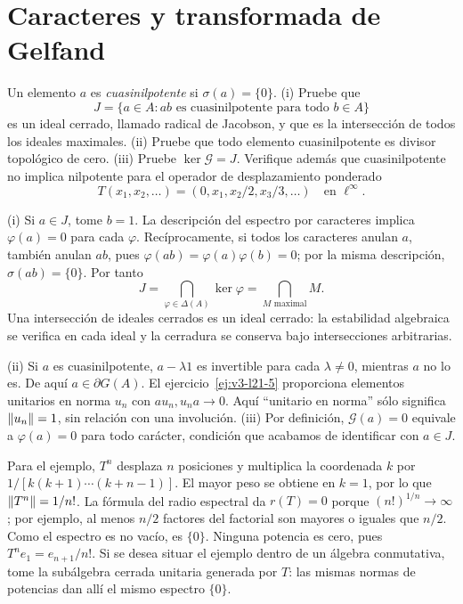 \chapter{Caracteres y transformada de Gelfand}

\begin{ejercicio}\label{ej:v3-l24-1}
Un elemento $a$ es \emph{cuasinilpotente} si $\sigma(a)=\{0\}$. (i) Pruebe que
\[
 J=\{a\in A:ab\text{ es cuasinilpotente para todo }b\in A\}
\]
es un ideal cerrado, llamado radical de Jacobson, y que es la intersección de todos los ideales maximales. (ii) Pruebe que todo elemento cuasinilpotente es divisor topológico de cero. (iii) Pruebe $\ker\mathcal G=J$. Verifique además que cuasinilpotente no implica nilpotente para el operador de desplazamiento ponderado
\[
 T(x_1,x_2,\ldots)=(0,x_1,x_2/2,x_3/3,\ldots)
 \quad\text{en }\ell^\infty.
\]
\end{ejercicio}
\begin{solucion}
(i) Si $a\in J$, tome $b=1$. La descripción del espectro por caracteres implica $\varphi(a)=0$ para cada $\varphi$. Recíprocamente, si todos los caracteres anulan $a$, también anulan $ab$, pues $\varphi(ab)=\varphi(a)\varphi(b)=0$; por la misma descripción, $\sigma(ab)=\{0\}$. Por tanto
\[
 J=\bigcap_{\varphi\in\Delta(A)}\ker\varphi
   =\bigcap_{M\text{ maximal}}M.
\]
Una intersección de ideales cerrados es un ideal cerrado: la estabilidad algebraica se verifica en cada ideal y la cerradura se conserva bajo intersecciones arbitrarias.

(ii) Si $a$ es cuasinilpotente, $a-\lambda1$ es invertible para cada $\lambda\ne0$, mientras $a$ no lo es. De aquí $a\in\partial G(A)$. El ejercicio~\ref{ej:v3-l21-5} proporciona elementos unitarios en norma $u_n$ con $au_n,u_na\to0$. Aquí ``unitario en norma'' sólo significa $\left\lVert u_n\right\rVert=1$, sin relación con una involución. (iii) Por definición, $\mathcal G(a)=0$ equivale a $\varphi(a)=0$ para todo carácter, condición que acabamos de identificar con $a\in J$.

Para el ejemplo, $T^n$ desplaza $n$ posiciones y multiplica la coordenada $k$ por $1/[k(k+1)\cdots(k+n-1)]$. El mayor peso se obtiene en $k=1$, por lo que $\left\lVert T^n\right\rVert=1/n!$. La fórmula del radio espectral da $r(T)=0$ porque $(n!)^{1/n}\to\infty$; por ejemplo, al menos $n/2$ factores del factorial son mayores o iguales que $n/2$. Como el espectro es no vacío, es $\{0\}$. Ninguna potencia es cero, pues $T^ne_1=e_{n+1}/n!$. Si se desea situar el ejemplo dentro de un álgebra conmutativa, tome la subálgebra cerrada unitaria generada por $T$: las mismas normas de potencias dan allí el mismo espectro $\{0\}$.
\end{solucion}

